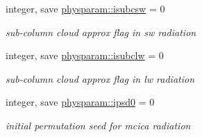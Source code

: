 \begin{DoxyCompactItemize}
integer, save \hyperlink{namespacephysparam_a2ec924900b312f94874ffb0f67d09dd9}{physparam\+::isubcsw} = 0
\begin{DoxyCompactList}\small\item\em sub-\/column cloud approx flag in sw radiation \end{DoxyCompactList}\item 
integer, save \hyperlink{namespacephysparam_a9555bc46102e3c368ca1f15c73b0692e}{physparam\+::isubclw} = 0
\begin{DoxyCompactList}\small\item\em sub-\/column cloud approx flag in lw radiation \end{DoxyCompactList}\item 
integer, save \hyperlink{namespacephysparam_adadc8b256d78414cf84290d1bec23fe6}{physparam\+::ipsd0} = 0
\begin{DoxyCompactList}\small\item\em initial permutation seed for mcica radiation \end{DoxyCompactList}\end{DoxyCompactItemize}
